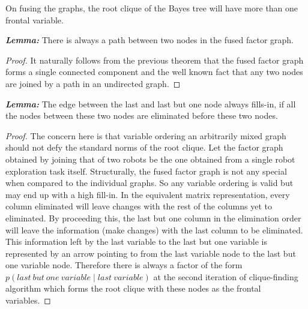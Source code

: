 \begin{theorem}
On fusing the graphs, the root clique of the Bayes tree will have more than one frontal variable.
\end{theorem}
\textit{\textbf{Lemma:}} There is always a path between two nodes in the fused factor graph.
\begin{proof}
It naturally follows from the previous theorem that the fused factor graph forms a single connected component and the well known fact that any two nodes are joined by a path in an undirected graph.
\end{proof}
\textit{\textbf{Lemma:}} The edge between the last and last but one node always fills-in, if all the nodes between these two nodes are eliminated before these two nodes.
\begin{proof}
The concern here is that variable ordering an arbitrarily mixed graph should not defy the standard norms of the root clique. Let the factor graph obtained by joining that of two robots be the one obtained from a single robot exploration task itself. Structurally, the fused factor graph is not any special when compared to the individual graphs. So any variable ordering is valid but may end up with a high fill-in. In the equivalent matrix representation, every column eliminated will leave changes with the rest of the columns yet to eliminated. By proceeding this, the last but one column in the elimination order will leave the information (make changes) with the last column to be eliminated. This information left by the last variable to the last but one variable is represented by an arrow pointing to from the last variable node to the last but one variable node. Therefore there is always a factor of the form $p(last \ but \ one \ variable \mid last \ variable)$ at the second iteration of clique-finding algorithm which forms the root clique with these nodes as the frontal variables. 
\end{proof}

